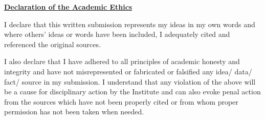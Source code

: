 \begin{titlepage}
\onehalfspacing
\begin{center}
	
\vspace{1cm}
\textbf{\large{\underline{Declaration of the Academic Ethics}}}\\
\vspace{0.5cm}
\end{center}
\doublespacing
I declare that this written submission represents my ideas in my own words and where
others' ideas or words have been included, I adequately cited and referenced the
original sources.

I also declare that I have adhered to all principles of academic honesty and integrity and have not misrepresented or fabricated or falsified any idea/ data/ fact/ source in my submission. I understand that any violation of the above will be a cause for disciplinary action by the Institute and can also evoke penal action from the sources which have not been properly cited or from whom proper permission has not been taken when needed.\\

\vskip 4cm

\begin{center}
\onehalfspacing
{\hfill {}}
\end{center}
\end{titlepage}


